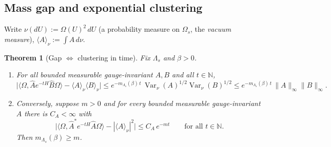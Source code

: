 \documentclass[11pt,a4paper]{article}
\newtheorem{theorem}{Theorem}[section]
\theoremstyle{definition}
\theoremstyle{remark}
\DeclareMathOperator{\Var}{Var}
\newcommand{\N}{\mathbb{N}}
\newcommand{\hA}{\hat{A}}
\newcommand{\hB}{\hat{B}}
\newcommand{\dU}{\,dU}
\newcommand{\ip}[2]{\langle #1,#2\rangle}
\newcommand{\norm}[1]{\lVert #1\rVert}
\begin{document}
\subsection{Mass gap and exponential clustering}

Write $\nu(dU):=\Omega(U)^2\dU$ (a probability measure on $\Omega_s$, the \emph{vacuum measure}), $\langle A\rangle_\nu:=\int A\,d\nu$.

\begin{theorem}[Gap $\Leftrightarrow$ clustering in time]\label{thm:gapclust}
Fix $\Lambda_s$ and $\beta>0$.
\begin{enumerate}[label=(\roman*)]
\item For all bounded measurable gauge-invariant $A,B$ and all $t\in\N$,
\[
\bigl|\ip\Omega{\hA e^{-tH}\hB\Omega}-\langle A\rangle_\nu\langle B\rangle_\nu\bigr|
\le e^{-m_{\Lambda_s}(\beta)\,t}\,\Var_\nu(A)^{1/2}\Var_\nu(B)^{1/2}
\le e^{-m_{\Lambda_s}(\beta)\,t}\,\norm A_\infty\norm B_\infty .
\]
\item Conversely, suppose $m>0$ and for every bounded measurable gauge-invariant $A$ there is $C_A<\infty$ with
\[
\bigl|\ip\Omega{\hA^*e^{-tH}\hA\Omega}-|\langle A\rangle_\nu|^2\bigr|\le C_A\,e^{-mt}\qquad\text{for all }t\in\N .
\]
Then $m_{\Lambda_s}(\beta)\ge m$.
\end{enumerate}
\end{theorem}
\end{document}
